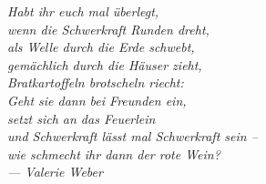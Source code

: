 \thispagestyle{empty}

\vspace*{3cm}


\begin{flushright}
	\slshape
	Habt ihr euch mal überlegt,\\
	wenn die Schwerkraft Runden dreht,\\
	als Welle durch die Erde schwebt,\\
	gemächlich durch die Häuser zieht,\\	
	Bratkartoffeln brotscheln riecht:\\	
	Geht sie dann bei Freunden ein,\\	
	setzt sich an das Feuerlein\\	
	und Schwerkraft lässt mal Schwerkraft sein --\\
	wie schmecht ihr dann der rote Wein?\\ \medskip
	--- Valerie Weber
\end{flushright}
